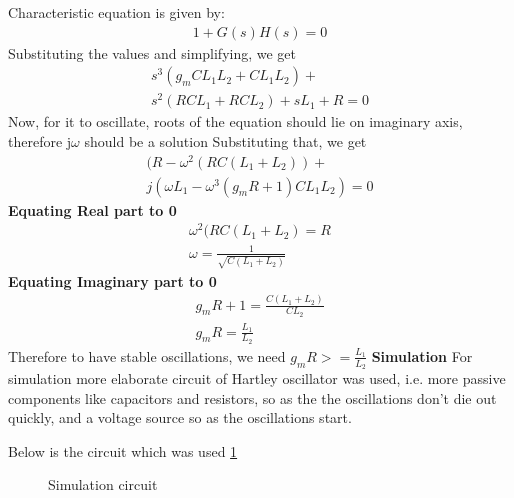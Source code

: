 \begin{enumerate}[label=\arabic*.,ref=\theenumi]
Characteristic equation is given by:\newline
\begin{align}
    1+G(s)H(s) = 0
\end{align}
Substituting the values and simplifying, we get\newline
\begin{multline}
    s^3(g_mCL_1L_2 + CL_1L_2) +\\ s^2(RCL_1 + RCL_2) + sL_1 + R =0
\end{multline}
Now, for it to oscillate, roots of the equation should lie on imaginary axis, therefore j$\omega$ should be a solution\newline
Substituting that, we get
\begin{multline}
    (R - \omega^2(RC(L_1 +L_2)) +\\ j(\omega L_1 - \omega^3(g_mR +1)CL_1L_2) = 0
\end{multline}
\textbf{Equating Real part to 0}\newline
\begin{align}
    \omega^2(RC(L_1 +L_2) = R\\
    \omega = \frac{1}{\sqrt{C(L_1 + L_2)}}
\end{align}
\textbf{Equating Imaginary part to 0}\newline
\begin{align}
    g_mR + 1 = \frac{C(L_1 +L_2)}{CL_2}\\
    g_mR = \frac{L_1}{L_2}
\end{align}
Therefore to have stable oscillations, we need \newline
$g_mR >= \frac{L_1}{L_2}$\newline\newline
\textbf{Simulation}\newline
For simulation more elaborate circuit of Hartley oscillator was used, i.e. more passive components like capacitors and resistors, so as the the oscillations don't die out quickly, and a voltage source so as the oscillations start.\newline

Below is the circuit which was used \ref{fig:ee18btech11019_fig4}
\begin{figure}[!ht]
	\begin{center}
		\resizebox{\columnwidth}{!}{}
	\end{center}
\caption{Simulation circuit}
\label{fig:ee18btech11019_fig4}
\end{figure}



\end{enumerate}
